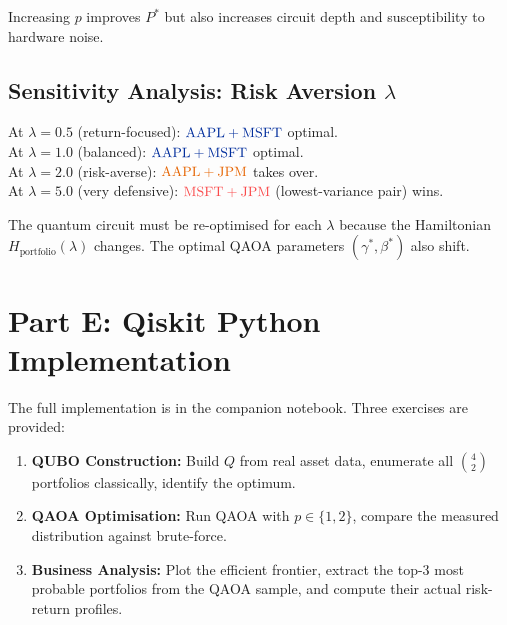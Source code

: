 \documentclass[a4paper,11pt]{article}
\newcommand{\crd}[1]{\textcolor{ibmred}{#1}}
\newcommand{\cblu}[1]{\textcolor{ibmblue}{#1}}
\newcommand{\corg}[1]{\textcolor{orangecolor}{#1}}
\begin{document}
Increasing $p$ improves $P^*$ but also increases circuit depth and
susceptibility to hardware noise.

\subsection{Sensitivity Analysis: Risk Aversion $\lambda$}

\begin{mathbox}
At $\lambda = 0.5$ (return-focused): $\cblu{\text{AAPL}+\text{MSFT}}$ optimal. \\
At $\lambda = 1.0$ (balanced):      $\cblu{\text{AAPL}+\text{MSFT}}$ optimal. \\
At $\lambda = 2.0$ (risk-averse):   $\corg{\text{AAPL}+\text{JPM}}$ takes over. \\
At $\lambda = 5.0$ (very defensive): $\crd{\text{MSFT}+\text{JPM}}$ (lowest-variance
                                                                    pair) wins.

\noindent The quantum circuit must be re-optimised for each $\lambda$
because the Hamiltonian $H_\text{portfolio}(\lambda)$ changes.
The optimal QAOA parameters $(\gamma^*,\beta^*)$ also shift.
\end{mathbox}

\section{Part E: Qiskit Python Implementation}

The full implementation is in the companion notebook. Three exercises
are provided:

\begin{enumerate}
    \item \textbf{QUBO Construction:} Build $Q$ from real asset data,
          enumerate all $\binom{4}{2}$ portfolios classically, identify
          the optimum.
    \item \textbf{QAOA Optimisation:} Run QAOA with $p \in \{1,2\}$,
          compare the measured distribution against brute-force.
    \item \textbf{Business Analysis:} Plot the efficient frontier,
          extract the top-3 most probable portfolios from the QAOA
          sample, and compute their actual risk-return profiles.
\end{enumerate}
\end{document}
